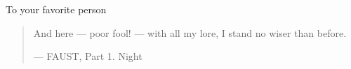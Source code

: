 
\begin{center}
\vspace*{52pt}
To your favorite person
 \vfill
 
\begin{centering}
\begin{quotation}
\begin{centering}
And here --- poor fool! --- with all my lore, I stand no wiser than before.
\begin{flushright}--- FAUST, Part 1. Night \end{flushright}
\end{centering}
\end{quotation}
\end{centering}
\end{center}

\pagebreak
